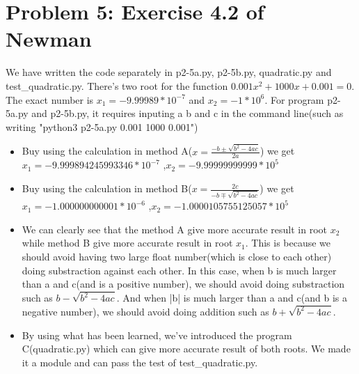 \documentclass[letterpaper,12pt]{article}
\begin{document}
\section{Problem 5: Exercise 4.2 of Newman}

We have written the code separately in p2-5a.py, p2-5b.py, quadratic.py and test\_quadratic.py. There's two root for the function $0.001x^2 + 1000x + 0.001 = 0$. The exact number is $x_1 = -9.99989*10^{-7}$ and $x_2 = -1*10^6$. For program p2-5a.py and p2-5b.py, it requires inputing a b and c in the command line(such as writing "python3 p2-5a.py 0.001 1000 0.001")

\begin{itemize}
    \item Buy using the calculation in method A($x = \frac{-b\pm \sqrt{b^2-4ac}}{2a}$) we get $x_1 = -9.999894245993346*10^{-7}$ ,$x_2 = -9.99999999999*10^{5}$
    \item Buy using the calculation in method B($x = \frac{2c}{-b\mp \sqrt{b^2-4ac}}$) we get $x_1 = -1.000000000001*10^{-6}$ ,$x_2 = -1.0000105755125057*10^{5}$
    \item We can clearly see that the method A give more accurate result in root $x_2$ while method B give more accurate result in root $x_1$. This is because we should avoid having two large float number(which is close to each other) doing substraction against each other. In this case, when b is much larger than a and c(and is a positive number), we should avoid doing substraction such as $b - \sqrt{b^2-4ac}$. And when |b| is much larger than a and c(and b is a negative number), we should avoid doing addition such as $b + \sqrt{b^2-4ac}$.
    \item By using what has been learned, we've introduced the program C(quadratic.py) which can give more accurate result of both roots. We made it a module and can pass the test of test\_quadratic.py.
\end{itemize}
\end{document}
